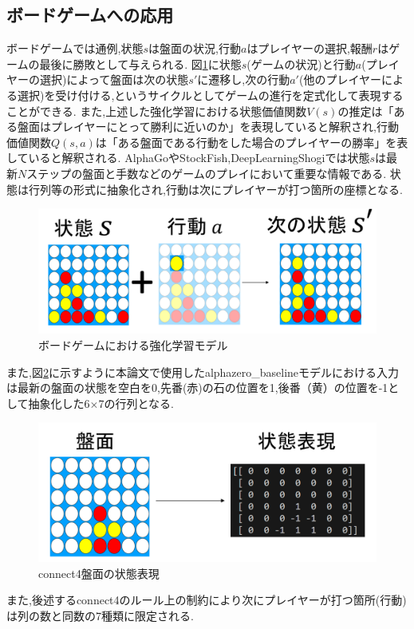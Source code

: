 \subsection{ボードゲームへの応用}
ボードゲームでは通例,状態$s$は盤面の状況,行動$a$はプレイヤーの選択,報酬$r$はゲームの最後に勝敗として与えられる.
図\ref{fig:board-game-model}に状態$s$(ゲームの状況)と行動$a$(プレイヤーの選択)によって盤面は次の状態$s'$に遷移し,次の行動$a'$(他のプレイヤーによる選択)を受け付ける,というサイクルとしてゲームの進行を定式化して表現することができる.
また,上述した強化学習における状態価値関数$V(s)$の推定は「ある盤面はプレイヤーにとって勝利に近いのか」を表現していると解釈され,行動価値関数$Q(s, a)$は「ある盤面である行動をした場合のプレイヤーの勝率」を表していると解釈される.
AlphaGo\cite{AlphaGo}やStockFish\cite{StockFish12},DeepLearningShogi\cite{dlshogi}では状態$s$は最新$N$ステップの盤面と手数などのゲームのプレイにおいて重要な情報である.
状態は行列等の形式に抽象化され,行動は次にプレイヤーが打つ箇所の座標となる.
\begin{figure}[t]
	\includegraphics[width=\linewidth]{./figure/transition.png}
	\caption{ボードゲームにおける強化学習モデル}
	\label{fig:board-game-model}
\end{figure}

また,図\ref{fig:connect4-symbol}に示すように本論文で使用したalphazero\_baselineモデル\cite{baseline}における入力は最新の盤面の状態を空白を0,先番(赤)の石の位置を1,後番（黄）の位置を-1として抽象化した6$\times$7の行列となる.
\begin{figure}[t]
	\centering
	\includegraphics[width=\linewidth]{./figure/symbolic.png}
	\caption{connect4盤面の状態表現}
	\label{fig:connect4-symbol}
\end{figure}
また,後述するconnect4のルール上の制約により次にプレイヤーが打つ箇所(行動)は列の数と同数の7種類に限定される.

